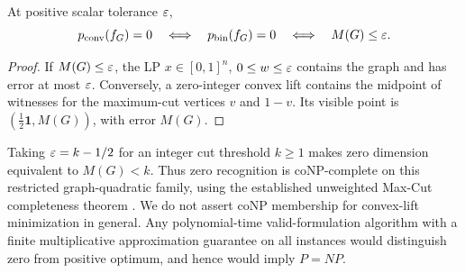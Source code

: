 \begin{lemma}\label{lem:zero-count-maxcut}
At positive scalar tolerance $\varepsilon$,
\[
 p_{\mathrm{conv}}(f_G)=0\quad\Longleftrightarrow\quad p_{\mathrm{bin}}(f_G)=0
               \quad\Longleftrightarrow\quad M(G)\le\varepsilon.
\]
\end{lemma}
\begin{proof}
If $M(G)\le\varepsilon$, the LP $x\in[0,1]^n$, $0\le w\le\varepsilon$ contains
the graph and has error at most $\varepsilon$. Conversely, a zero-integer
convex lift contains the midpoint of witnesses for the maximum-cut
vertices $v$ and $1-v$. Its visible point is
$(\frac12\mathbf1,M(G))$, with error $M(G)$.
\end{proof}

Taking $\varepsilon=k-1/2$ for an integer cut threshold $k\ge1$ makes zero
dimension equivalent to $M(G)<k$. Thus zero recognition is coNP-complete
on this restricted graph-quadratic family, using the established
unweighted Max-Cut completeness theorem \citep{garey1976}. We do not
assert coNP membership for convex-lift minimization in general.
Any polynomial-time valid-formulation algorithm with a finite
multiplicative approximation guarantee on all instances would distinguish
zero from positive optimum, and hence would imply $P=NP$.

